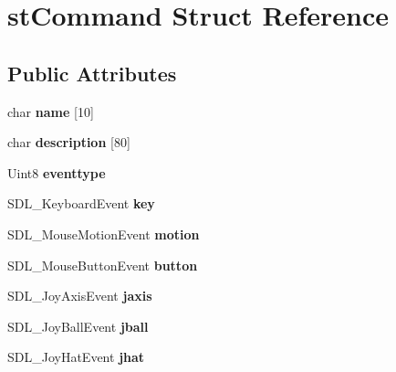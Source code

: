 \hypertarget{structst_command}{
\section{stCommand Struct Reference}
\label{structst_command}
}
\subsection*{Public Attributes}
\begin{DoxyCompactItemize}
\item 
\hypertarget{structst_command_adc9037ff32f1be54b7b9aa6d2c25c13c}{
char {\bfseries name} \mbox{[}10\mbox{]}}
\label{structst_command_adc9037ff32f1be54b7b9aa6d2c25c13c}

\item 
\hypertarget{structst_command_af8029c3777029bd2a2fba5c40e2517e6}{
char {\bfseries description} \mbox{[}80\mbox{]}}
\label{structst_command_af8029c3777029bd2a2fba5c40e2517e6}

\item 
\hypertarget{structst_command_ad1ab1677bdde5aee31609aa5fae2765a}{
Uint8 {\bfseries eventtype}}
\label{structst_command_ad1ab1677bdde5aee31609aa5fae2765a}

\item 
\hypertarget{structst_command_aaf624a3d16f2cef49ef8f74275947afa}{
SDL\_\-KeyboardEvent {\bfseries key}}
\label{structst_command_aaf624a3d16f2cef49ef8f74275947afa}

\item 
\hypertarget{structst_command_a2324a020405c918b916978b65d80b51f}{
SDL\_\-MouseMotionEvent {\bfseries motion}}
\label{structst_command_a2324a020405c918b916978b65d80b51f}

\item 
\hypertarget{structst_command_a67d48cd50dd5d74be886961dfc201037}{
SDL\_\-MouseButtonEvent {\bfseries button}}
\label{structst_command_a67d48cd50dd5d74be886961dfc201037}

\item 
\hypertarget{structst_command_a505a0dd03accd7d67cffa90e11f244cd}{
SDL\_\-JoyAxisEvent {\bfseries jaxis}}
\label{structst_command_a505a0dd03accd7d67cffa90e11f244cd}

\item 
\hypertarget{structst_command_ae2936768cb96863f0067754617d60898}{
SDL\_\-JoyBallEvent {\bfseries jball}}
\label{structst_command_ae2936768cb96863f0067754617d60898}

\item 
\hypertarget{structst_command_af7f952a2ce116ab839a36b55fe5880b0}{
SDL\_\-JoyHatEvent {\bfseries jhat}}
\label{structst_command_af7f952a2ce116ab839a36b55fe5880b0}


\end{DoxyCompactItemize}
